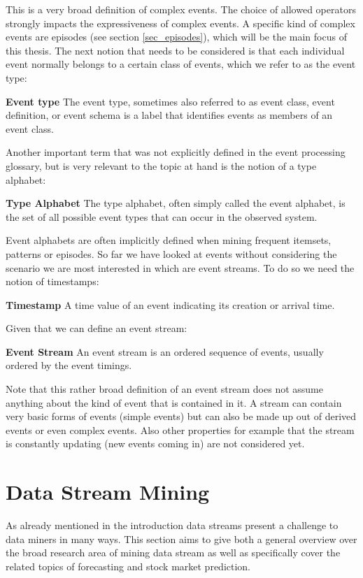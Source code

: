 This is a very broad definition of complex events. The choice of allowed operators strongly impacts the expressiveness of complex events. A specific kind of complex events are episodes (see section \ref{sec_episodes}), which will be the main focus of this thesis.
The next notion that needs to be considered is that each individual event normally belongs to a certain class of events, which we refer to as the event type:

\begin{mydef}
\textbf{Event type} The event type, sometimes also referred to as event class, event definition, or event schema is a label that identifies events as members of an event class.
\end{mydef}

Another important term that was not explicitly defined in the event processing glossary, but is very relevant to the topic at hand is the notion of a type alphabet:

\begin{mydef}
\textbf{Type Alphabet} The type alphabet, often simply called the event alphabet, is the set of all possible event types that can occur in the observed system.
\end{mydef}

Event alphabets are often implicitly defined when mining frequent itemsets, patterns or episodes.
So far we have looked at events without considering the scenario we are most interested in which are event streams. To do so we need the notion of timestamps:

\begin{mydef}
\textbf{Timestamp} A time value of an event indicating its creation or arrival time.
\end{mydef}

Given that we can define an event stream:

\begin{mydef}
\textbf{Event Stream} An event stream is an ordered sequence of events, usually ordered by the event timings.
\end{mydef}

Note that this rather broad definition of an event stream does not assume anything about the kind of event that is contained in it. A stream can contain very basic forms of events (simple events) but can also be made up out of derived events or even complex events. Also other properties for example that the stream is constantly updating (new events coming in) are not considered yet.


\section{Data Stream Mining}
\label{sec_streamMining}
As already mentioned in the introduction data streams present a challenge to data miners in many ways. This section aims to give both a general overview over the broad research area of mining data stream as well as specifically cover the related topics of forecasting and stock market prediction.

